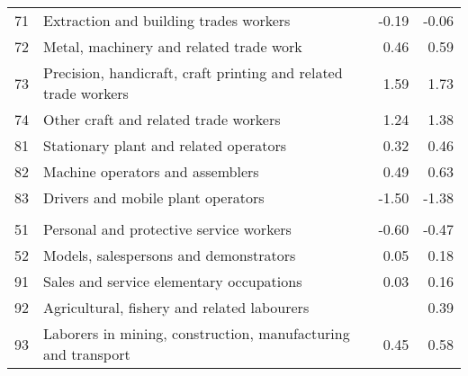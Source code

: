 \begin{tabular}{rlrr}
\hspace{1em}71 & Extraction and building trades workers & -0.19 & -0.06\\
\hspace{1em}72 & Metal, machinery and related trade work & 0.46 & 0.59\\
\hspace{1em}73 & Precision, handicraft, craft printing and related trade workers & 1.59 & 1.73\\
\hspace{1em}74 & Other craft and related trade workers & 1.24 & 1.38\\
\hspace{1em}81 & Stationary plant and related operators & 0.32 & 0.46\\
\hspace{1em}82 & Machine operators and assemblers & 0.49 & 0.63\\
\hspace{1em}83 & Drivers and mobile plant operators & -1.50 & -1.38\\
\addlinespace[0.3em]
\multicolumn{4}{l}{\textbf{Low-paying occupations}}\\
\hspace{1em}51 & Personal and protective service workers & -0.60 & -0.47\\
\hspace{1em}52 & Models, salespersons and demonstrators & 0.05 & 0.18\\
\hspace{1em}91 & Sales and service elementary occupations & 0.03 & 0.16\\
\hspace{1em}92 & Agricultural, fishery and related labourers &  & 0.39\\
\hspace{1em}93 & Laborers in mining, construction, manufacturing and transport & 0.45 & 0.58\\
\bottomrule
\end{tabular}
